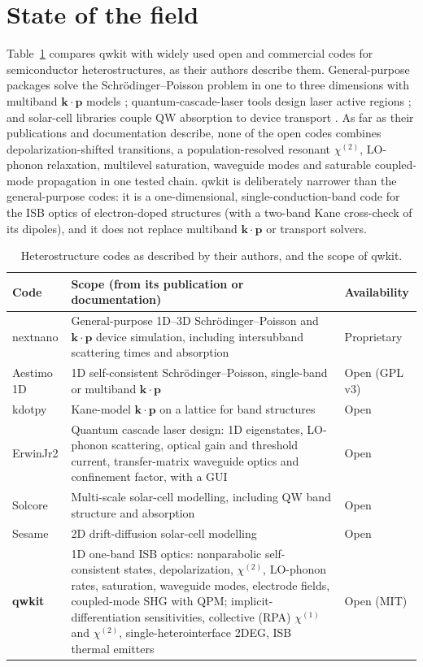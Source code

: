 \documentclass[11pt]{article}
\newcommand{\chitwo}{\chi^{(2)}}
\begin{document}
\section{State of the field}
Table~\ref{tab:field} compares qwkit with widely used open and commercial codes for semiconductor heterostructures, as their authors describe them. General-purpose packages solve the Schr\"odinger--Poisson problem in one to three dimensions with multiband $\mathbf{k}\cdot\mathbf{p}$ models \cite{Birner2007,Hebal2021,Beugeling2025}; quantum-cascade-laser tools design laser active regions \cite{ErwinJr2}; and solar-cell libraries couple QW absorption to device transport \cite{AlonsoAlvarez2018,Gaury2019}. As far as their publications and documentation describe, none of the open codes combines depolarization-shifted transitions, a population-resolved resonant $\chitwo$, LO-phonon relaxation, multilevel saturation, waveguide modes and saturable coupled-mode propagation in one tested chain. qwkit is deliberately narrower than the general-purpose codes: it is a one-dimensional, single-conduction-band code for the ISB optics of electron-doped structures (with a two-band Kane cross-check of its dipoles), and it does not replace multiband $\mathbf{k}\cdot\mathbf{p}$ or transport solvers.

\begin{table}[t]
\centering\small
\caption{Heterostructure codes as described by their authors, and the scope of qwkit.}\label{tab:field}
\begin{tabularx}{\textwidth}{@{}lXl@{}}
\toprule
Code & Scope (from its publication or documentation) & Availability \\ \midrule
nextnano \cite{Birner2007} & General-purpose 1D--3D Schr\"odinger--Poisson and $\mathbf{k}\cdot\mathbf{p}$ device simulation, including intersubband scattering times and absorption \cite{nextnanoBench} & Proprietary \\
Aestimo 1D \cite{Hebal2021} & 1D self-consistent Schr\"odinger--Poisson, single-band or multiband $\mathbf{k}\cdot\mathbf{p}$ & Open (GPL v3) \\
kdotpy \cite{Beugeling2025} & Kane-model $\mathbf{k}\cdot\mathbf{p}$ on a lattice for band structures & Open \\
ErwinJr2 \cite{ErwinJr2} & Quantum cascade laser design: 1D eigenstates, LO-phonon scattering, optical gain and threshold current, transfer-matrix waveguide optics and confinement factor, with a GUI & Open \\
Solcore \cite{AlonsoAlvarez2018} & Multi-scale solar-cell modelling, including QW band structure and absorption & Open \\
Sesame \cite{Gaury2019} & 2D drift-diffusion solar-cell modelling & Open \\
\textbf{qwkit} & 1D one-band ISB optics: nonparabolic self-consistent states, depolarization, $\chitwo$, LO-phonon rates, saturation, waveguide modes, electrode fields, coupled-mode SHG with QPM; implicit-differentiation sensitivities, collective (RPA) $\chi^{(1)}$ and $\chitwo$, single-heterointerface 2DEG, ISB thermal emitters & Open (MIT) \\ \bottomrule
\end{tabularx}
\end{table}
\end{document}
